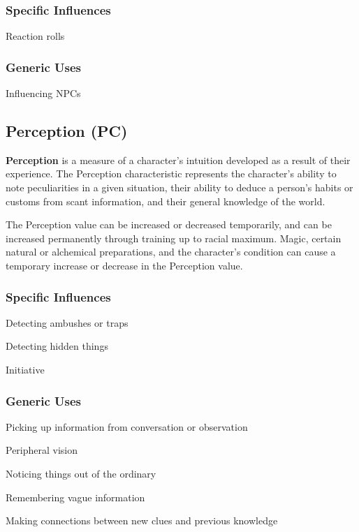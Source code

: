\begin{multicols*}{3}
\subsubsection{Specific Influences}
\begin{Itemize}
\item Reaction rolls
\end{Itemize}
\subsubsection{Generic Uses}
\begin{Itemize}
\item Influencing NPCs
\end{Itemize}

\subsection{Perception (PC)}

\textbf{Perception} is a measure of a character's intuition developed
as a result of their experience.  The Perception characteristic
represents the character's ability to note peculiarities in a given
situation, their ability to deduce a person's habits or customs from
scant information, and their general knowledge of the world.

The Perception value can be increased or decreased temporarily, and
can be increased permanently through training up to racial maximum.
Magic, certain natural or alchemical preparations, and the character's
condition can cause a temporary increase or decrease in the Perception
value.
\subsubsection{Specific Influences}
\begin{Itemize}
\item Detecting ambushes or traps
\item Detecting hidden things
\item Initiative
\end{Itemize}
\subsubsection{Generic Uses}
\begin{Itemize}
\item Picking up information from conversation or observation
\item Peripheral vision
\item Noticing things out of the ordinary
\item Remembering vague information
\item Making connections between new clues and previous knowledge
\end{Itemize}


\end{multicols*}
